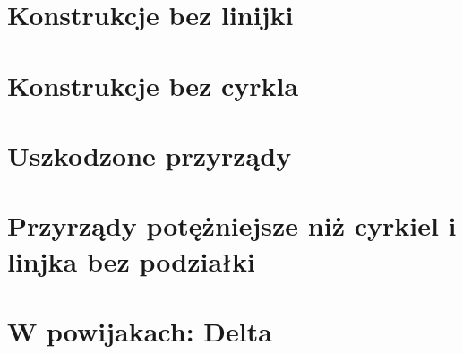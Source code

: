\section{Konstrukcje bez linijki}



\section{Konstrukcje bez cyrkla}


\section{Uszkodzone przyrządy}


\section{Przyrządy potężniejsze niż cyrkiel i linjka bez podziałki}


\section{W powijakach: Delta}


